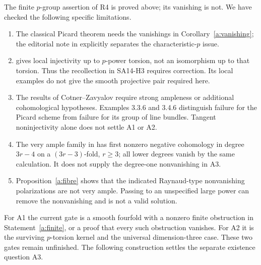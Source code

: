 The finite $p$-group assertion of R4 is proved above; its vanishing is
not.  We have checked the following specific limitations.
\begin{enumerate}[leftmargin=*]
\item The classical Picard theorem needs the vanishings in
Corollary~\ref{a:vanishing}; the editorial note in
\cite[Expos\'e XII, section 4, note 5, p.~128]{SGA2} explicitly separates
the characteristic-$p$ issue.
\item \cite[Theorem 0.1]{BhattDeJong2014} gives local injectivity up
to $p$-power torsion, not an isomorphism up to that torsion.  Thus the
recollection in SA14-H3 requires correction.  Its local examples do not
give the smooth projective pair required here.
\item The results of Cotner--Zavyalov
\cite[Theorem 3.4.4 and Corollary 3.4.5]{CotnerZavyalov2024}
require strong ampleness or additional cohomological hypotheses.
Examples 3.3.6 and 3.4.6 distinguish failure for the Picard scheme
from failure for its group of line bundles.  Tangent noninjectivity alone
does not settle A1 or A2.
\item The very ample family in \cite[section 2]{LauritzenRao1997}
has first nonzero negative cohomology in degree $3r-4$ on a
$(3r-3)$-fold, $r\geq3$; all lower degrees vanish by the same
calculation.  It does not supply the degree-one nonvanishing in A3.
\item Proposition~\ref{a:fibre} shows that the indicated Raynaud-type
nonvanishing polarizations are not very ample.  Passing to an unspecified
large power can remove the nonvanishing and is not a valid solution.
\end{enumerate}
For A1 the current gate is a smooth fourfold with a nonzero finite
obstruction in Statement~\ref{a:finite}, or a proof that every such
obstruction vanishes. For A2 it is the surviving $p$-torsion kernel and
the universal dimension-three case. These two gates remain unfinished.
The following construction settles the separate existence question A3.

